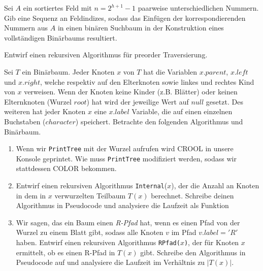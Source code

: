 \documentclass{uebung_cs}
\begin{document}
\begin{aufgabe}
	Sei $A$ ein sortiertes Feld mit $n = 2^{h+1}-1$ paarweise unterschiedlichen Nummern.
	Gib eine Sequenz an Feldindizes, sodass das Einfügen der korrespondierenden Nummern aus $A$ in einen binären Suchbaum in der Konstruktion eines vollständigen Binärbaums resultiert.
\end{aufgabe}

\begin{aufgabe}
	Entwirf einen rekursiven Algorithmus für preorder Traversierung.
\end{aufgabe}

\begin{aufgabe}
	Sei $T$ ein Binärbaum.
	Jeder Knoten $x$ von $T$ hat die Variablen $x.parent$, $x.left$ und $x.right$, welche respektiv auf den Elterknoten sowie linkes und rechtes Kind von $x$ verweisen.
	Wenn der Knoten keine Kinder (z.B. Blätter) oder keinen Elternknoten (Wurzel $root$) hat wird der jeweilige Wert auf $null$ gesetzt.
	Des weiteren hat jeder Knoten $x$ eine $x.label$ Variable, die auf einen einzelnen Buchstaben ($character$) speichert.
	Betrachte den folgenden Algorithmus und Binärbaum.
	\begin{algorithmic}
			\EndIf
			\EndIf
		\EndIf
	\end{algorithmic}
		
	\begin{enumerate}
		\item Wenn wir \texttt{PrintTree} mit der Wurzel aufrufen wird \glqq CROOL\grqq{} in unsere Konsole geprintet.
		Wie muss \texttt{PrintTree} modifiziert werden, sodass wir stattdessen \glqq COLOR\grqq{} bekommen.
		\item Entwirf einen rekursiven Algorithmus \texttt{Internal}($x$), der die Anzahl an Knoten in dem in $x$ verwurzelten Teilbaum $T(x)$ berechnet.
		Schreibe deinen Algorithmus in Pseudocode und analysiere die Laufzeit als Funktion 
		\item Wir sagen, das ein Baum einen \textit{R-Pfad} hat, wenn es einen Pfad von der Wurzel zu einem Blatt gibt, sodass alle Knoten $v$ im Pfad $v.label = 'R'$ haben.
		Entwirf einen rekursiven Algorithmus \texttt{RPfad($x$)}, der für Knoten $x$ ermittelt, ob es einen R-Pfad in $T(x)$ gibt.
		Schreibe den Algorithmus in Pseudocode auf und analysiere die Laufzeit im Verhältnis zu $|T(x)|$.
	\end{enumerate}
\end{aufgabe}
\end{document}
